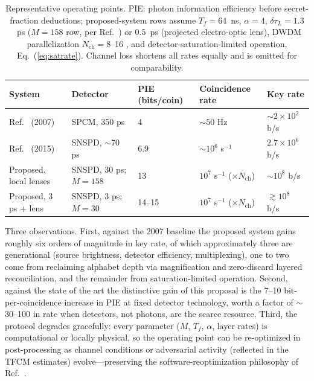 \documentclass[11pt]{article}
\begin{document}
\begin{table}[t]
\centering
\begin{tabular}{lllll}
\hline\hline
System & Detector & PIE (bits/coin) & Coincidence rate & Key rate \\
\hline
Ref.~\cite{AliKhan2007} (2007) & SPCM, 350 ps & 4 & $\sim 50$ Hz & $\sim 2\times10^2$ b/s \\
Ref.~\cite{Zhong2015} (2015) & SNSPD, $\sim$70 ps & 6.9 & $\sim 10^6$ s$^{-1}$ & $2.7\times10^6$ b/s \\
Proposed, local lenses & SNSPD, 30 ps; $M{=}158$ & 13 & $10^7$ s$^{-1}$ ($\times N_{\mathrm{ch}}$) & $\sim 10^8$ b/s \\
Proposed, 3 ps + lens & SNSPD, 3 ps; $M{=}30$ & 14--15 & $10^7$ s$^{-1}$ ($\times N_{\mathrm{ch}}$) & $\gtrsim 10^8$ b/s \\
\hline\hline
\end{tabular}
\caption{Representative operating points. PIE: photon information efficiency before secret-fraction deductions; proposed-system rows assume $T_f = 64$~ns, $\alpha = 4$, $\delta\tau_L = 1.3$~ps ($M{=}158$ row, per Ref.~\cite{Joshi2022}) or $0.5$~ps (projected electro-optic lens), DWDM parallelization $N_{\mathrm{ch}} = 8$--16 \cite{Mower2011}, and detector-saturation-limited operation, Eq.~(\ref{eq:satrate}). Channel loss shortens all rates equally and is omitted for comparability.}
\label{tab:rates}
\end{table}

Three observations. First, against the 2007 baseline the proposed system gains roughly six orders of magnitude in key rate, of which approximately three are generational (source brightness, detector efficiency, multiplexing), one to two come from reclaiming alphabet depth via magnification and zero-discard layered reconciliation, and the remainder from saturation-limited operation. Second, against the state of the art \cite{Zhong2015,Islam2017} the distinctive gain of this proposal is the 7--10 bit-per-coincidence increase in PIE at fixed detector technology, worth a factor of $\sim$30--100 in rate when detectors, not photons, are the scarce resource. Third, the protocol degrades gracefully: every parameter ($M$, $T_f$, $\alpha$, layer rates) is computational or locally physical, so the operating point can be re-optimized in post-processing as channel conditions or adversarial activity (reflected in the TFCM estimates) evolve---preserving the software-reoptimization philosophy of Ref.~\cite{AliKhan2007}.
\end{document}
